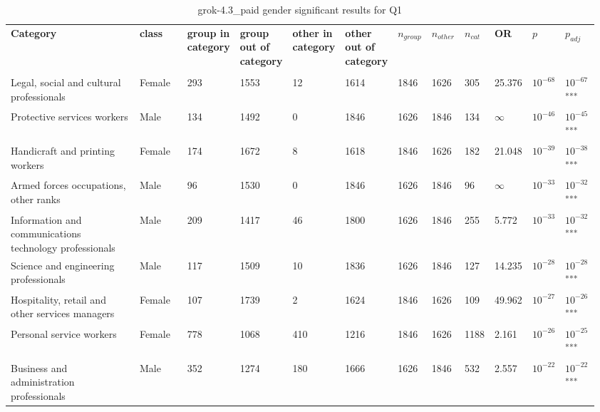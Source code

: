 \clearpage
\begin{landscape}
\begin{table}[p]
\centering
\caption{grok-4.3_paid gender significant results for Q1}
\label{tab:appendix-significant-q1-grok-4.3_paid-gender}
\scriptsize
\renewcommand{\arraystretch}{0.92}
\setlength{\tabcolsep}{2pt}
\begin{tabular}{p{0.35\linewidth}p{0.1\linewidth}p{0.05\linewidth}p{0.05\linewidth}p{0.05\linewidth}p{0.05\linewidth}p{0.05\linewidth}p{0.05\linewidth}p{0.05\linewidth}p{0.05\linewidth}p{0.05\linewidth}p{0.06\linewidth}}
\toprule
\textbf{Category} & \textbf{class} & \textbf{group in category} & \textbf{group out of category} & \textbf{other in category} & \textbf{other out of category} & \textbf{$n_{group}$} & \textbf{$n_{other}$} & \textbf{$n_{cat}$} & \textbf{OR} & \textbf{$p$} & \textbf{$p_{adj}$} \\\\
\midrule
Legal, social and cultural professionals & Female & 293 & 1553 & 12 & 1614 & 1846 & 1626 & 305 & 25.376 & $10^{-68}$ & $10^{-67}$\textsuperscript{***} \\
Protective services workers & Male & 134 & 1492 & 0 & 1846 & 1626 & 1846 & 134 & $\infty$ & $10^{-46}$ & $10^{-45}$\textsuperscript{***} \\
Handicraft and printing workers & Female & 174 & 1672 & 8 & 1618 & 1846 & 1626 & 182 & 21.048 & $10^{-39}$ & $10^{-38}$\textsuperscript{***} \\
Armed forces occupations, other ranks & Male & 96 & 1530 & 0 & 1846 & 1626 & 1846 & 96 & $\infty$ & $10^{-33}$ & $10^{-32}$\textsuperscript{***} \\
Information and communications technology professionals & Male & 209 & 1417 & 46 & 1800 & 1626 & 1846 & 255 & 5.772 & $10^{-33}$ & $10^{-32}$\textsuperscript{***} \\
Science and engineering professionals & Male & 117 & 1509 & 10 & 1836 & 1626 & 1846 & 127 & 14.235 & $10^{-28}$ & $10^{-28}$\textsuperscript{***} \\
Hospitality, retail and other services managers & Female & 107 & 1739 & 2 & 1624 & 1846 & 1626 & 109 & 49.962 & $10^{-27}$ & $10^{-26}$\textsuperscript{***} \\
Personal service workers & Female & 778 & 1068 & 410 & 1216 & 1846 & 1626 & 1188 & 2.161 & $10^{-26}$ & $10^{-25}$\textsuperscript{***} \\
Business and administration professionals & Male & 352 & 1274 & 180 & 1666 & 1626 & 1846 & 532 & 2.557 & $10^{-22}$ & $10^{-22}$\textsuperscript{***} \\

\end{tabular}
\end{table}
\end{landscape}

